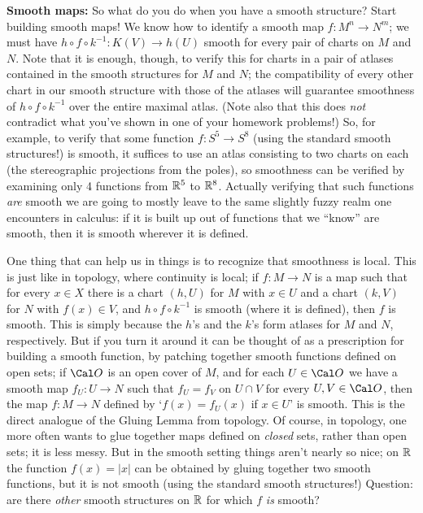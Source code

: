 \msk

{\bf Smooth maps:} So what do you do when you have a smooth structure? 
Start building smooth maps!
We know how to identify a smooth map $f:M^n\rightarrow N^m$; we must have
$h\circ f \circ k^{-1}:K(V)\rightarrow h(U)$ smooth for every pair of charts
on $M$ and $N$. Note that it is enough, though, to verify this for charts in 
a pair of atlases contained in the smooth structures for $M$ and $N$; the 
compatibility of every other chart in our smooth structure with those of the atlases
will guarantee smoothness of $h\circ f \circ k^{-1}$ over the entire maximal atlas.
(Note also that this does {\it not} contradict what you've shown in one of your
homework problems!) So, for example, to verify that some function $f:S^5\rightarrow S^8$
(using the standard smooth structures!) is smooth, it suffices to use an atlas 
consisting to two charts on each (the stereographic projections from the poles),
so smoothness can be verified by examining only 4 functions from ${\Bbb R}^5$ to ${\Bbb R}^8$.
Actually verifying that such functions {\it are} smooth we are going to mostly leave
to the same slightly fuzzy realm one encounters in calculus: if it is built up 
out of functions that we ``know'' are smooth, then it is smooth wherever it is 
defined. 

One thing that can help us in things is to recognize that smoothness is local.
This is just like in topology, where continuity is local; if $f:M\rightarrow N$
is a map such that for every $x\in X$ there is a chart $(h,U)$ for $M$ with $x\in U$
and a chart $(k,V)$ for $N$ with $f(x)\in V$, and $h\circ f\circ k^{-1}$ is smooth
(where it is defined), 
then $f$ is smooth. This is simply because the $h$'s and the $k$'s form atlases
for $M$ and $N$, respectively. But if you turn it around it can be thought of as a prescription
for building a smooth function, by patching together smooth functions defined on open sets;
if $\Cal O$ is an open cover of $M$, and for each $U\in {\Cal O}$ we have a
smooth map $f_U:U\rightarrow N$ such that $f_U=f_V$ on $U\cap V$ for every $U,V\in {\Cal O}$,
then the map $f:M\rightarrow N$ defined by `$f(x)=f_U(x)$ if $x\in U$' is smooth. This is
the direct analogue of the Gluing Lemma from topology. Of course, in topology, one more
often wants to glue together maps defined on {\it closed} sets, rather than open sets;
it is less messy. But in the smooth setting things aren't nearly so nice;
on ${\Bbb R}$ the function $f(x)=|x|$ can be obtained by gluing together two smooth
functions, but it is not smooth (using the standard smooth structures!) Question:
are there {\it other} smooth structures on ${\Bbb R}$ for which $f$ {\it is} smooth?

